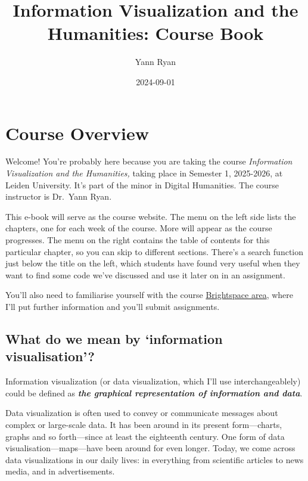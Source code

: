\documentclass[
  letterpaper,
  DIV=11,
  numbers=noendperiod]{scrreprt}
\title{Information Visualization and the Humanities: Course Book}
\author{Yann Ryan}
\date{2024-09-01}
\renewcommand*\contentsname{Table of contents}
\newcommand\contentsname{Table of contents}
\begin{document}
\maketitle

\renewcommand*\contentsname{Table of contents}
{
\hypersetup{linkcolor=}
\setcounter{tocdepth}{2}
\tableofcontents
}


\chapter*{Course Overview}\label{course-overview}


Welcome! You're probably here because you are taking the course
\emph{Information Visualization and the Humanities,} taking place in
Semester 1, 2025-2026, at Leiden University. It's part of the minor in
Digital Humanities. The course instructor is Dr.~Yann Ryan.

This e-book will serve as the course website. The menu on the left side
lists the chapters, one for each week of the course. More will appear as
the course progresses. The menu on the right contains the table of
contents for this particular chapter, so you can skip to different
sections. There's a search function just below the title on the left,
which students have found very useful when they want to find some code
we've discussed and use it later on in an assignment.

You'll also need to familiarise yourself with the course
\href{https://brightspace.universiteitleiden.nl/d2l/home/402636}{Brightspace
area}, where I'll put further information and you'll submit assignments.

\section*{What do we mean by `information
visualisation'?}\label{what-do-we-mean-by-information-visualisation}


Information visualization (or data visualization, which I'll use
interchangeablely) could be defined as \textbf{\emph{the graphical
representation of information and data}}.

Data visualization is often used to convey or communicate messages about
complex or large-scale data. It has been around in its present
form---charts, graphs and so forth---since at least the eighteenth
century. One form of data visualisation---maps---have been around for
even longer. Today, we come across data visualizations in our daily
lives: in everything from scientific articles to news media, and in
advertisements.
\end{document}
